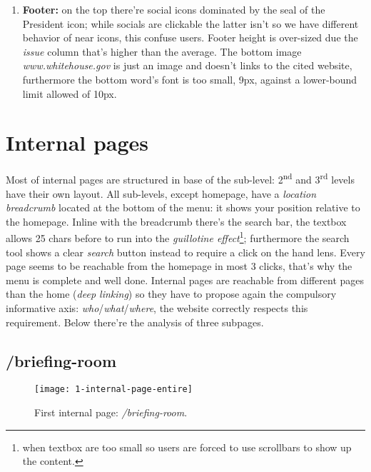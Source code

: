 \documentclass[
10pt, %
a4paper, %
oneside, %
headinclude,footinclude, %
BCOR5mm, %
]{scrartcl}
\begin{document}
\begin{enumerate}
		\item \textbf{Footer:} on the top there're social icons dominated by the seal of the President icon; while socials are clickable the latter isn't so we have different behavior of near icons, this confuse users.
		Footer height is over-sized due the \emph{issue} column that's higher than the average. The bottom image \emph{www.whitehouse.gov} is just an image and doesn't links to the cited website, furthermore the bottom word's font is too small, 9px, against a lower-bound limit allowed of 10px. 
		
	\end{enumerate}


\section{Internal pages}
Most of internal pages are structured in base of the sub-level: 2\textsuperscript{nd} and 3\textsuperscript{rd} levels have their own layout.
All sub-levels, except homepage, have a \emph{location breadcrumb} located at the bottom of the menu: it shows your position relative to the homepage. Inline with the breadcrumb there's the search bar, the textbox allows 25 chars before to run into the \emph{guillotine effect}\footnote{when textbox are too small so users are forced to use scrollbars to show up the content.}; furthermore the search tool shows a clear \emph{search} button instead to require a click on the hand lens. 
Every page seems to be reachable from the homepage in most 3 clicks, that's why the menu is complete and well done. 
Internal pages are reachable from different pages than the home (\emph{deep linking}) so they have to propose again the compulsory informative axis: \emph{who}/\emph{what}/\emph{where}, the website correctly respects this requirement.
Below there're the analysis of three subpages.

	\subsection{/briefing-room}
	\label{primapaginainterna}
	

	\begin{figure}[h!]
	\centering 
	\centerline{\texttt{[image: 1-internal-page-entire]}}
	\caption[First internal page: /briefing-room]{First internal page: \emph{/briefing-room}.}
	\label{fig:primapaginainterna} 
	\end{figure}
\end{document}
